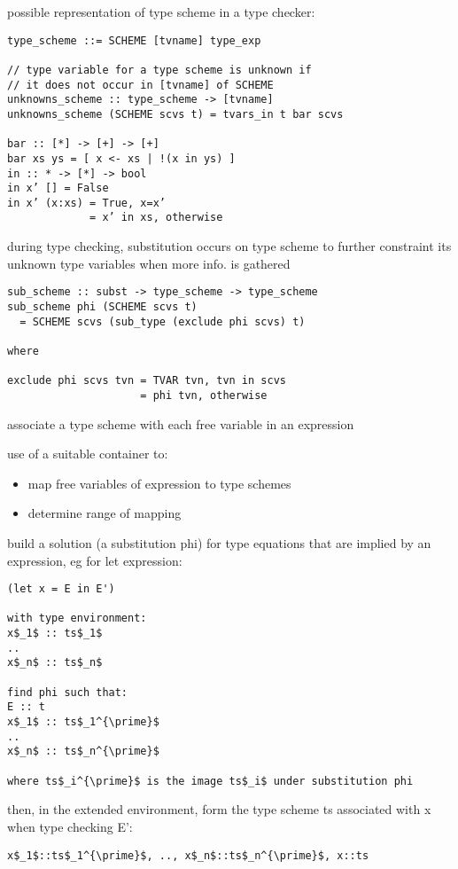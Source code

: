 \documentclass[8pt]{extarticle}
\begin{document}
\begin{multicols*}{2}
possible representation of type scheme in a type checker:
\begin{verbatim}
type_scheme ::= SCHEME [tvname] type_exp

// type variable for a type scheme is unknown if
// it does not occur in [tvname] of SCHEME
unknowns_scheme :: type_scheme -> [tvname]
unknowns_scheme (SCHEME scvs t) = tvars_in t bar scvs

bar :: [*] -> [+] -> [+]
bar xs ys = [ x <- xs | !(x in ys) ]
in :: * -> [*] -> bool
in x’ [] = False
in x’ (x:xs) = True, x=x’
             = x’ in xs, otherwise
\end{verbatim}

during type checking, substitution occurs on type scheme to further constraint its unknown type variables when more info. is gathered

\begin{verbatim}
sub_scheme :: subst -> type_scheme -> type_scheme
sub_scheme phi (SCHEME scvs t)
  = SCHEME scvs (sub_type (exclude phi scvs) t)

where

exclude phi scvs tvn = TVAR tvn, tvn in scvs
                     = phi tvn, otherwise
\end{verbatim}

associate a type scheme with each free variable in an expression

use of a suitable container to:
\begin{itemize}
\item map free variables of expression to type schemes
\item determine range of mapping
\end{itemize}

build a solution (a substitution phi) for type equations that are implied by an expression, eg for let expression:
\begin{lstlisting}
(let x = E in E')

with type environment:
x$_1$ :: ts$_1$
..
x$_n$ :: ts$_n$

find phi such that:
E :: t
x$_1$ :: ts$_1^{\prime}$
..
x$_n$ :: ts$_n^{\prime}$

where ts$_i^{\prime}$ is the image ts$_i$ under substitution phi
\end{lstlisting}

then, in the extended environment, form the type scheme ts associated with x when type checking E':
\begin{lstlisting}
x$_1$::ts$_1^{\prime}$, .., x$_n$::ts$_n^{\prime}$, x::ts
\end{lstlisting}


\end{multicols*}
\end{document}
